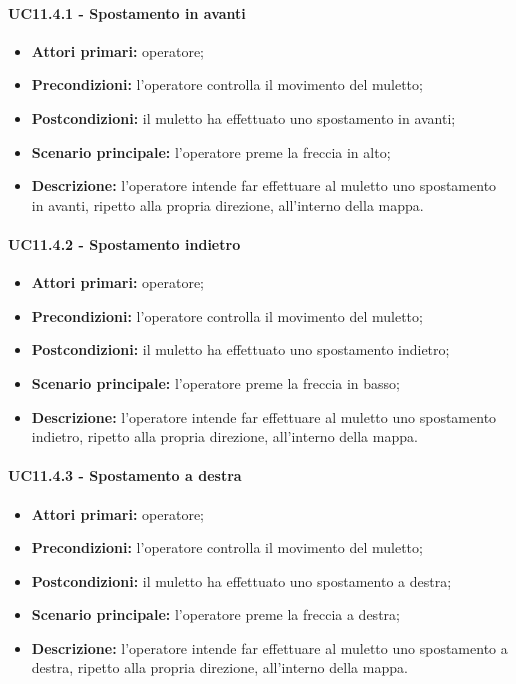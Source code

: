 \paragraph{UC11.4.1 - Spostamento in avanti}
\begin{itemize}
	\item 	\textbf{Attori primari:} operatore;
	\item 	\textbf{Precondizioni:} l'operatore controlla il movimento del muletto;
	\item 	\textbf{Postcondizioni:} il muletto ha effettuato uno spostamento in avanti; 
	\item 	\textbf{Scenario principale:} l'operatore preme la freccia in alto;
	\item 	\textbf{Descrizione:} l'operatore intende far effettuare al muletto uno spostamento in avanti, ripetto alla propria direzione, all'interno della mappa.

\end{itemize}

\paragraph{UC11.4.2 - Spostamento indietro}
\begin{itemize}
	\item 	\textbf{Attori primari:} operatore;
	\item 	\textbf{Precondizioni:} l'operatore controlla il movimento del muletto;
	\item 	\textbf{Postcondizioni:} il muletto ha effettuato uno spostamento indietro; 
	\item 	\textbf{Scenario principale:} l'operatore preme la freccia in basso;
	\item 	\textbf{Descrizione:} l'operatore intende far effettuare al muletto uno spostamento indietro, ripetto alla propria direzione, all'interno della mappa.
\end{itemize}

\paragraph{UC11.4.3 - Spostamento a destra}
\begin{itemize}
	\item 	\textbf{Attori primari:} operatore;
	\item 	\textbf{Precondizioni:} l'operatore controlla il movimento del muletto;
	\item 	\textbf{Postcondizioni:} il muletto ha effettuato uno spostamento a destra; 
	\item 	\textbf{Scenario principale:} l'operatore preme la freccia a destra;
	\item 	\textbf{Descrizione:} l'operatore intende far effettuare al muletto uno spostamento a destra, ripetto alla propria direzione, all'interno della mappa.

\end{itemize}

